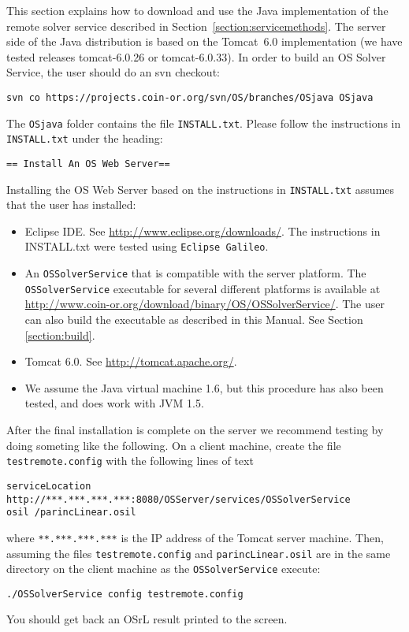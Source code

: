 \label{section:tomcat}

This section explains how to download and use the Java implementation of the
remote solver service described in Section~\ref{section:servicemethods}.
The server side of the Java distribution is based on the Tomcat~6.0
implementation (we have tested releases tomcat-6.0.26 or tomcat-6.0.33).   In order to build an OS Solver Service, the user should do an
svn checkout:

\begin{verbatim}
svn co https://projects.coin-or.org/svn/OS/branches/OSjava OSjava
\end{verbatim}

The {\tt OSjava} folder contains the file {\tt INSTALL.txt}. Please follow the
instructions in {\tt  INSTALL.txt} under the heading:
\begin{verbatim}
== Install An OS Web Server==
\end{verbatim}

Installing the OS Web Server based on the instructions in {\tt INSTALL.txt}
assumes that the user has installed:

\begin{itemize}
  \item Eclipse IDE.  See  \url{http://www.eclipse.org/downloads/}.  The instructions in
  INSTALL.txt were tested using {\tt Eclipse Galileo}.  
  
  \item An {\tt OSSolverService} that is compatible  with the server platform.  
  The {\tt OSSolverService} executable for several different platforms is
  available at \url{http://www.coin-or.org/download/binary/OS/OSSolverService/}. 
  The user can also build the executable as described in this Manual.  See
  Section \ref{section:build}.
  
  \item Tomcat 6.0. See \url{http://tomcat.apache.org/}.
  
  \item We assume the Java virtual machine 1.6, but this procedure has also been tested, and does work with JVM 1.5.
\end{itemize}

After the final installation is complete on the server we recommend testing  by
doing someting like the following. On a client machine, create  the file {\tt
testremote.config} with the following lines of text
\begin{verbatim}
serviceLocation http://***.***.***.***:8080/OSServer/services/OSSolverService
osil /parincLinear.osil
\end{verbatim}
where {\tt ***.***.***.***} is the IP address of the Tomcat server machine. Then, assuming the files
{\tt testremote.config} and {\tt parincLinear.osil} are in the same directory on the client machine as the
{\tt OSSolverService} execute:
\begin{verbatim}
./OSSolverService config testremote.config
\end{verbatim}
You should get back an OSrL result printed to the screen.




